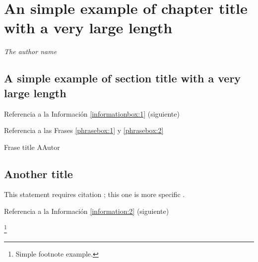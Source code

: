 \chapter{An simple example of chapter title with a very large length}

\begin{phrasebox}{}{\textit{The author name}}
\label{phrasebox:2}
\textit{\lipsum[1][1-3]}
\end{phrasebox}

\vspace{1ex}
\lipsum[1][1-4] 
\section{A simple example of section title with a very large length}

\lipsum[1][1-3] 
Referencia a la Información \ref{informationbox:1} (siguiente)

\begin{informationbox}[Título A]
\label{informationbox:1}
\lipsum[1][1-3] 
\end{informationbox}

\lipsum[1]

\lipsum[1][1-3]
Referencia a las Frases \ref{phrasebox:1} y \ref{phrasebox:2} 

\begin{phrasebox}{Frase title A}{Autor}
\label{phrasebox:1}
\lipsum[1][1-2] 
\end{phrasebox}

\lipsum[1][1-3] 

\begin{citationbox}
\lipsum[1][1-3] 
\end{citationbox}

\section{Another title}

This statement requires citation \cite{book_key}; this one is more specific \cite[122]{article_key}.
\lipsum[1][1-4]
 
Referencia a la Información \ref{information:2} (siguiente)

\begin{informationbox}[Título B]
\label{information:2}
\lipsum[1][1-3]\footnote{Simple footnote example.}
\end{informationbox}

